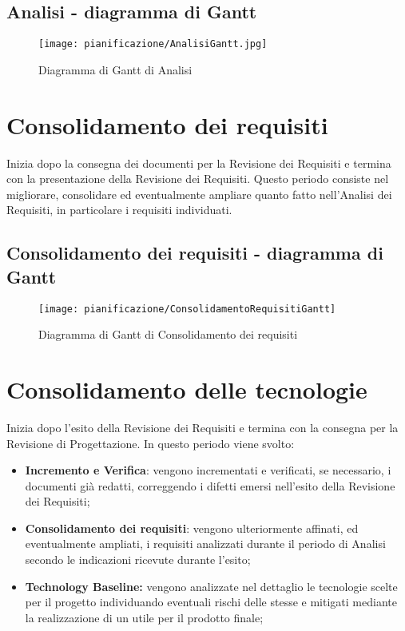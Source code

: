 \documentclass[../PianodiProgetto.tex]{subfiles}
\begin{document}
	\subsection{Analisi - diagramma di Gantt}
	\begin{figure}[H]
		\texttt{[image: pianificazione/AnalisiGantt.jpg]}	
		\caption{Diagramma di Gantt di Analisi}\label{fig:1}	
	\end{figure}

	\newpage
	\section{Consolidamento dei requisiti} Inizia dopo la consegna dei documenti per la Revisione dei Requisiti e termina con la presentazione della Revisione dei Requisiti. Questo periodo consiste nel migliorare, consolidare ed eventualmente ampliare quanto fatto nell'Analisi dei Requisiti, in particolare i requisiti individuati.
	
	\subsection{Consolidamento dei requisiti - diagramma di Gantt}
	\begin{figure}[H]
		\texttt{[image: pianificazione/ConsolidamentoRequisitiGantt]}	
		\caption{Diagramma di Gantt di Consolidamento dei requisiti}\label{fig:2}
	\end{figure}

	\newpage
	\section{Consolidamento delle tecnologie} Inizia dopo l'esito della Revisione dei Requisiti e termina con la consegna per la Revisione di Progettazione. In questo periodo viene svolto:

	\begin{itemize}	
		\item \textbf{Incremento e Verifica}: vengono incrementati e verificati, se necessario, i documenti già redatti, correggendo i difetti emersi nell'esito della Revisione dei Requisiti;
		\item \textbf{Consolidamento dei requisiti}: vengono ulteriormente affinati, ed eventualmente ampliati, i requisiti analizzati durante il periodo di Analisi secondo le indicazioni ricevute durante l'esito;
		\item \textbf{Technology Baseline:} vengono analizzate nel dettaglio le tecnologie scelte per il progetto individuando eventuali rischi delle stesse e mitigati mediante la realizzazione di un  utile per il prodotto finale;
	\end{itemize}
\end{document}
